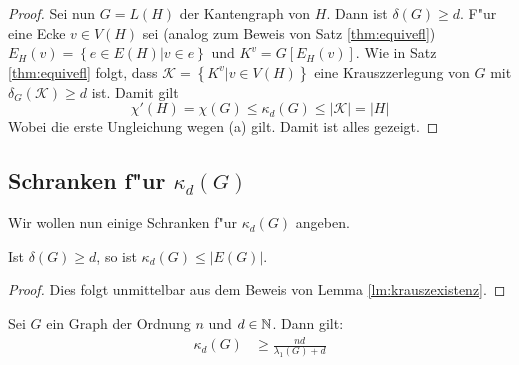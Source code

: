 \begin{proof}
  Sei nun $G=L(H)$ der Kantengraph von $H$. Dann ist $\delta(G) \geq d$. F"ur eine Ecke  $v\in V(H)$ sei (analog zum Beweis von  Satz \ref{thm:equivefl}) $E_{H}(v) = \left\{ e\in E(H) | v\in e \right\}$ und $K^{v} = G[E_{H}(v)]$. Wie in Satz \ref{thm:equivefl} folgt, dass $\mathcal{K}=\left\{ K^{v} | v \in V(H) \right\}$ eine Krauszzerlegung von $G$ mit $\delta_{G}(\mathcal{K}) \geq d$ ist. Damit gilt
  \begin{equation*}
    \chi'(H) = \chi(G) \leq \kappa_{d}(G) \leq |\mathcal{K}| = |H|
  \end{equation*}
  Wobei die erste Ungleichung wegen (a) gilt. Damit ist alles gezeigt. 
\end{proof}


\subsection{Schranken f"ur $\kappa_d(G)$}

Wir wollen nun einige Schranken f"ur $\kappa_{d}(G)$ angeben. 
\begin{lemma}
  Ist $\delta(G) \geq d$, so ist $\kappa_{d}(G) \leq |E(G)|$. 
\end{lemma}
\begin{proof}
  Dies folgt unmittelbar aus dem Beweis von Lemma \ref{lm:krauszexistenz}. 
\end{proof}

\begin{theorem}
  Sei $G$ ein Graph der Ordnung $n$ und $d\in {\mathbb{N}}$. Dann gilt:
  \begin{align*}
    \kappa_{d}(G) &\geq \frac{nd}{\lambda_{1}(G) +d} 
  \end{align*}
  \label{thm:kappaineq1}
\end{theorem}

